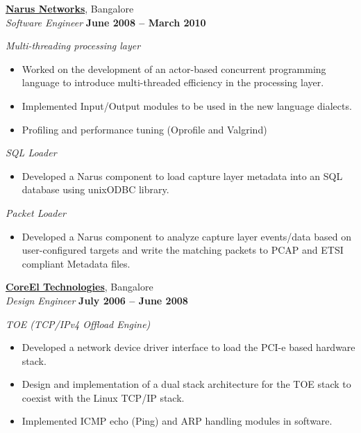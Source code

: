 \documentclass[a4paper,margin,line]{resume}
\begin{document}
\begin{resume}
    \href{http://www.narus.com/}{\textbf{Narus Networks}}, Bangalore \vspace{2mm}\\\vspace{1mm}%
    \textsl{Software Engineer} \hfill \textbf{June 2008 -- March 2010}%
	
	\textsl{Multi-threading processing layer}
	\begin{itemize}
		\item Worked on the development of an actor-based concurrent programming language to introduce multi-threaded efficiency in the processing layer.%
		\item Implemented Input/Output modules to be used in the new language dialects.%
		\item Profiling and performance tuning (Oprofile and Valgrind) %
	\end{itemize}

	\textsl{SQL Loader}
	\begin{itemize}
		\item Developed a Narus component to load capture layer metadata into an SQL database using unixODBC library. %
	\end{itemize}

	\textsl{Packet Loader}
	\begin{itemize}
		\item Developed a Narus component to analyze capture layer events/data based on user-configured targets and write the matching packets to PCAP and ETSI compliant Metadata files. \vspace{0mm}\\\vspace{1mm}%
	\end{itemize} 

\pagebreak 

    \href{http://www.coreel.com/}{\textbf{CoreEl Technologies}}, Bangalore \vspace{2mm}\\\vspace{1mm}%
    \textsl{Design Engineer} \hfill \textbf{July 2006 -- June 2008}%
	
	\textsl{TOE (TCP/IPv4 Offload Engine)}
	\begin{itemize}
		\item Developed a network device driver interface to load the PCI-e based hardware stack. %
		\item Design and implementation of a dual stack architecture for the TOE stack to coexist with the Linux TCP/IP stack. %
		\item Implemented ICMP echo (Ping) and ARP handling modules in software. %
	\end{itemize}
 

\end{resume}
\end{document}
